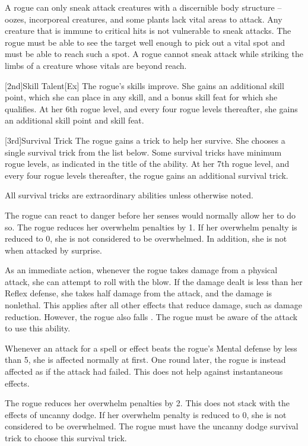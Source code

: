A rogue can only sneak attack creatures with a discernible body structure -- oozes, incorporeal creatures, and some plants lack vital areas to attack.
Any creature that is immune to critical hits is not vulnerable to sneak attacks.
The rogue must be able to see the target well enough to pick out a vital spot and must be able to reach such a spot.
A rogue cannot sneak attack while striking the limbs of a creature whose vitals are beyond reach.

[2nd]{Skill Talent}[Ex]
The rogue's skills improve.
She gains an additional skill point, which she can place in any skill, and a bonus skill feat for which she qualifies.
At her 6th rogue level, and every four rogue levels thereafter, she gains an additional skill point and skill feat.

[3rd]{Survival Trick}
The rogue gains a trick to help her survive.
She chooses a single survival trick from the list below.
Some survival tricks have minimum rogue levels, as indicated in the title of the ability.
At her 7th rogue level, and every four rogue levels thereafter, the rogue gains an additional survival trick.

All survival tricks are extraordinary abilities unless otherwise noted.

    The rogue can react to danger before her senses would normally allow her to do so.
    The rogue reduces her overwhelm penalties by 1.
    If her overwhelm penalty is reduced to 0, she is not considered to be overwhelmed.
    In addition, she is not \unaware when attacked by surprise.

    As an immediate action, whenever the rogue takes damage from a physical attack, she can attempt to roll with the blow.
    If the damage dealt is less than her Reflex defense, she takes half damage from the attack, and the damage is nonlethal.
    This applies after all other effects that reduce damage, such as damage reduction.
    However, the rogue also falls \prone.
    The rogue must be aware of the attack to use this ability.

    Whenever an attack for a  spell or effect beats the rogue's Mental defense by less than 5, she is affected normally at first.
    One round later, the rogue is instead affected as if the attack had failed.
    This does not help against instantaneous effects.

    The rogue reduces her overwhelm penalties by 2.
    This does not stack with the effects of uncanny dodge.
    If her overwhelm penalty is reduced to 0, she is not considered to be overwhelmed.
    The rogue must have the uncanny dodge survival trick to choose this survival trick.

